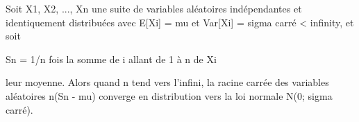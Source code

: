 \documentclass{article}
\begin{document}

Soit X1, X2, ..., Xn une suite de variables aléatoires
indépendantes et identiquement distribuées avec 
E[Xi] = mu et Var[Xi] = sigma carré < infinity, 
et soit

Sn = 1/n fois la somme de i allant de 1 à n de Xi

leur moyenne. Alors quand n tend vers l'infini,
la racine carrée des variables aléatoires n(Sn - mu)
converge en distribution vers la loi normale N(0; sigma carré).

\end{document}
